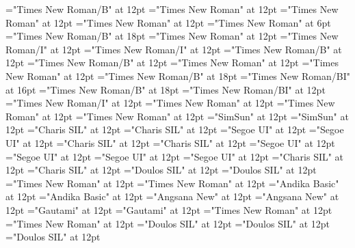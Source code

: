 \documentclass[c5paper,twoside]{article}
\begin{document}
\font\NoteTargetReferencezxxNoteGeneralParagraphParagraphscrSectioncolumnsscrBookscrBody="Times New Roman/B" at 12pt
\font\NoteGeneralParagraphParagraphscrSectioncolumnsscrBookscrBody="Times New Roman" at 12pt
\font\spanParagraphscrSectioncolumnsscrBookscrBody="Times New Roman" at 12pt
\font\spanzxxParagraphscrSectioncolumnsscrBookscrBody="Times New Roman" at 12pt
\font\VerseNumberzxxParagraphscrSectioncolumnsscrBookscrBody="Times New Roman" at 6pt
\font\ChapterNumberzxxParagraphscrSectioncolumnsscrBookscrBody="Times New Roman/B" at 18pt
\font\ParagraphscrSectioncolumnsscrBookscrBody="Times New Roman" at 12pt
\font\spanzxxParallelPassageReferencescrSectioncolumnsscrBookscrBody="Times New Roman/I" at 12pt
\font\ParallelPassageReferencescrSectioncolumnsscrBookscrBody="Times New Roman/I" at 12pt
\font\spanzxxSectionHeadscrSectioncolumnsscrBookscrBody="Times New Roman/B" at 12pt
\font\SectionHeadscrSectioncolumnsscrBookscrBody="Times New Roman/B" at 12pt
\font\scrSectioncolumnsscrBookscrBody="Times New Roman" at 12pt
\font\columnsscrBookscrBody="Times New Roman" at 12pt
\font\spanzxxTitleMainscrBookscrBody="Times New Roman/B" at 18pt
\font\TitleSecondaryzxxTitleMainscrBookscrBody="Times New Roman/BI" at 16pt
\font\TitleMainscrBookscrBody="Times New Roman/B" at 18pt
\font\scrBookCodezxxscrBookscrBody="Times New Roman/BI" at 12pt
\font\scrBookNamezxxscrBookscrBody="Times New Roman/I" at 12pt
\font\scrBookscrBody="Times New Roman" at 12pt
\font\imgpicturedivpictureLeft="Times New Roman" at 12pt
\font\picturepictureRight="Times New Roman" at 12pt
\font\spanzhCN="SimSun" at 12pt
\font\divzhCN="SimSun" at 12pt
\font\spanvi="Charis SIL" at 12pt
\font\divvi="Charis SIL" at 12pt
\font\spantsi="Segoe UI" at 12pt
\font\divtsi="Segoe UI" at 12pt
\font\spantsiZxxxxaudio="Charis SIL" at 12pt
\font\divtsiZxxxxaudio="Charis SIL" at 12pt
\font\spantsixstr="Segoe UI" at 12pt
\font\divtsixstr="Segoe UI" at 12pt
\font\spantsifonipa="Segoe UI" at 12pt
\font\divtsifonipa="Segoe UI" at 12pt
\font\spantr="Charis SIL" at 12pt
\font\divtr="Charis SIL" at 12pt
\font\spantrfonipa="Doulos SIL" at 12pt
\font\divtrfonipa="Doulos SIL" at 12pt
\font\spantrfonipaxemic="Times New Roman" at 12pt
\font\divtrfonipaxemic="Times New Roman" at 12pt
\font\spantpi="Andika Basic" at 12pt
\font\divtpi="Andika Basic" at 12pt
\font\spanth="Angsana New" at 12pt
\font\divth="Angsana New" at 12pt
\font\spante="Gautami" at 12pt
\font\divte="Gautami" at 12pt
\font\spanswc="Times New Roman" at 12pt
\font\divswc="Times New Roman" at 12pt
\font\spanseh="Doulos SIL" at 12pt
\font\divseh="Doulos SIL" at 12pt
\font\spansehfonipaxetic="Doulos SIL" at 12pt
\end{document}
